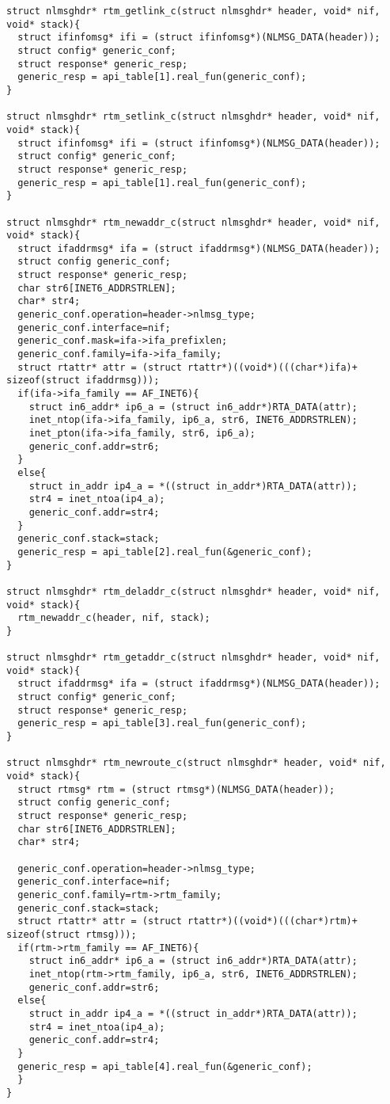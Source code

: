 \begin{lstlisting}[style=CscriptStyle]
struct nlmsghdr* rtm_getlink_c(struct nlmsghdr* header, void* nif, void* stack){
  struct ifinfomsg* ifi = (struct ifinfomsg*)(NLMSG_DATA(header));
  struct config* generic_conf;
  struct response* generic_resp;
  generic_resp = api_table[1].real_fun(generic_conf);
}

struct nlmsghdr* rtm_setlink_c(struct nlmsghdr* header, void* nif, void* stack){
  struct ifinfomsg* ifi = (struct ifinfomsg*)(NLMSG_DATA(header));
  struct config* generic_conf;
  struct response* generic_resp;
  generic_resp = api_table[1].real_fun(generic_conf);
}

struct nlmsghdr* rtm_newaddr_c(struct nlmsghdr* header, void* nif, void* stack){
  struct ifaddrmsg* ifa = (struct ifaddrmsg*)(NLMSG_DATA(header));
  struct config generic_conf;
  struct response* generic_resp;
  char str6[INET6_ADDRSTRLEN];
  char* str4;
  generic_conf.operation=header->nlmsg_type;
  generic_conf.interface=nif;
  generic_conf.mask=ifa->ifa_prefixlen;
  generic_conf.family=ifa->ifa_family;
  struct rtattr* attr = (struct rtattr*)((void*)(((char*)ifa)+ sizeof(struct ifaddrmsg)));
  if(ifa->ifa_family == AF_INET6){
    struct in6_addr* ip6_a = (struct in6_addr*)RTA_DATA(attr);
    inet_ntop(ifa->ifa_family, ip6_a, str6, INET6_ADDRSTRLEN);
    inet_pton(ifa->ifa_family, str6, ip6_a);
    generic_conf.addr=str6;
  }
  else{
    struct in_addr ip4_a = *((struct in_addr*)RTA_DATA(attr));
    str4 = inet_ntoa(ip4_a);
    generic_conf.addr=str4;
  }
  generic_conf.stack=stack;
  generic_resp = api_table[2].real_fun(&generic_conf);
}

struct nlmsghdr* rtm_deladdr_c(struct nlmsghdr* header, void* nif, void* stack){
  rtm_newaddr_c(header, nif, stack);
}

struct nlmsghdr* rtm_getaddr_c(struct nlmsghdr* header, void* nif, void* stack){
  struct ifaddrmsg* ifa = (struct ifaddrmsg*)(NLMSG_DATA(header));
  struct config* generic_conf;
  struct response* generic_resp;
  generic_resp = api_table[3].real_fun(generic_conf);
}

struct nlmsghdr* rtm_newroute_c(struct nlmsghdr* header, void* nif, void* stack){
  struct rtmsg* rtm = (struct rtmsg*)(NLMSG_DATA(header));
  struct config generic_conf;
  struct response* generic_resp;
  char str6[INET6_ADDRSTRLEN];
  char* str4;

  generic_conf.operation=header->nlmsg_type;
  generic_conf.interface=nif;
  generic_conf.family=rtm->rtm_family;
  generic_conf.stack=stack;
  struct rtattr* attr = (struct rtattr*)((void*)(((char*)rtm)+ sizeof(struct rtmsg)));
  if(rtm->rtm_family == AF_INET6){
    struct in6_addr* ip6_a = (struct in6_addr*)RTA_DATA(attr);
    inet_ntop(rtm->rtm_family, ip6_a, str6, INET6_ADDRSTRLEN);
    generic_conf.addr=str6;
  else{
    struct in_addr ip4_a = *((struct in_addr*)RTA_DATA(attr));
    str4 = inet_ntoa(ip4_a);
    generic_conf.addr=str4;
  }
  generic_resp = api_table[4].real_fun(&generic_conf);
  }
}


\end{lstlisting}
